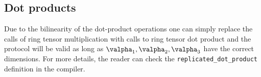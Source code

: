 \subsection{Dot products}

Due to the bilinearity of the dot-product operations
one can simply replace the calls of ring tensor multiplication with
calls to ring tensor dot product and the protocol will be valid as long as
$\valpha_1, \valpha_2, \valpha_3$ have the correct dimensions.
For more details, the reader can check the
\verb|replicated_dot_product| definition in the compiler.




